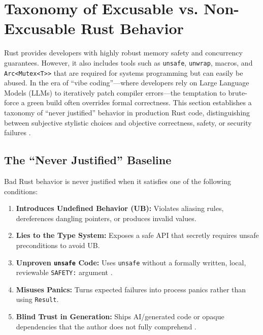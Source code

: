\section{Taxonomy of Excusable vs. Non-Excusable Rust Behavior}
\label{sec:bad_rust}

Rust provides developers with highly robust memory safety and concurrency guarantees. However, it also includes tools such as \texttt{unsafe}, \texttt{unwrap}, macros, and \texttt{Arc<Mutex<T>>} that are required for systems programming but can easily be abused. In the era of ``vibe coding''---where developers rely on Large Language Models (LLMs) to iteratively patch compiler errors---the temptation to brute-force a green build often overrides formal correctness. This section establishes a taxonomy of ``never justified'' behavior in production Rust code, distinguishing between subjective stylistic choices and objective correctness, safety, or security failures \cite{rust_reference_ub, rustonomicon}.

\subsection{The ``Never Justified'' Baseline}

Bad Rust behavior is never justified when it satisfies one of the following conditions:
\begin{enumerate}
    \item \textbf{Introduces Undefined Behavior (UB):} Violates aliasing rules, dereferences dangling pointers, or produces invalid values.
    \item \textbf{Lies to the Type System:} Exposes a safe API that secretly requires unsafe preconditions to avoid UB.
    \item \textbf{Unproven \texttt{unsafe} Code:} Uses \texttt{unsafe} without a formally written, local, reviewable \texttt{SAFETY:} argument \cite{std_dev_guide_safety}.
    \item \textbf{Misuses Panics:} Turns expected failures into process panics rather than using \texttt{Result}.
    \item \textbf{Blind Trust in Generation:} Ships AI/generated code or opaque dependencies that the author does not fully comprehend \cite{arxiv_llm_crypto}.
\end{enumerate}

